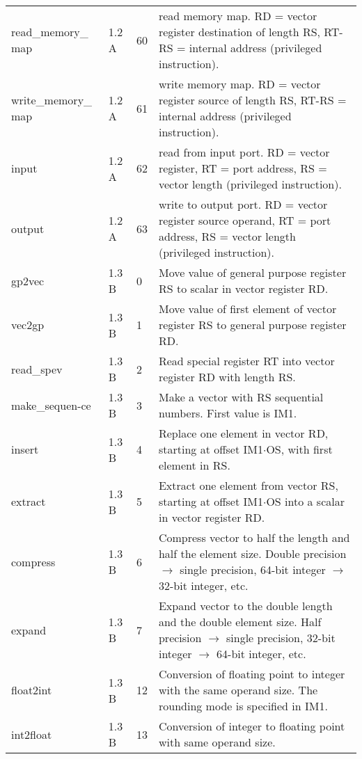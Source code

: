 \documentclass[forwardcom.tex]{subfiles}
\begin{document}
\begin{longtable} {|p{25mm}|p{14mm}|p{10mm}|p{95mm}|}
read\_memory\_ map & 1.2 A & 60 & read memory map. RD = vector register destination of length RS, RT-RS = internal address (privileged instruction). \\
write\_memory\_ map & 1.2 A & 61 & write memory map. RD = vector register source of length RS, RT-RS = internal address (privileged instruction). \\

input         & 1.2 A & 62 & read from input port. RD = vector register, RT = port address, RS = vector length (privileged instruction). \\
output        & 1.2 A & 63 & write to output port. RD = vector register source operand, RT = port address, RS = vector length (privileged instruction). \\

gp2vec        & 1.3 B &  0 & Move value of general purpose register RS to scalar in vector register RD. \\

vec2gp        & 1.3 B &  1 & Move value of first element of vector register RS to general purpose register RD. \\

read\_spev    & 1.3 B &  2 & Read special register RT into vector register RD with  length RS. \\

make\_sequen-ce& 1.3 B & 3 & Make a vector with RS sequential numbers. First value is IM1. \\

insert        & 1.3 B &  4 & Replace one element in vector RD, starting at offset IM1$\cdot$OS, with first element in RS. \\

extract       & 1.3 B & 5 & Extract one element from vector RS, starting at offset IM1$\cdot$OS into a scalar in vector register RD. \\

compress      & 1.3 B  &  6 & Compress vector to half the length and half the element size. Double precision $\rightarrow$ single precision, 64-bit
integer $\rightarrow$ 32-bit integer, etc. \\

expand        & 1.3 B &  7 & Expand vector to the double length and the double element size. Half precision $\rightarrow$ single precision, 32-bit integer $\rightarrow$ 64-bit integer, etc. \\

float2int     & 1.3 B & 12 & Conversion of floating point to integer with the same operand size. The rounding mode is specified in IM1. \\
int2float     & 1.3 B & 13 & Conversion of integer to floating point with same operand size. \\


\end{longtable}
\end{document}
